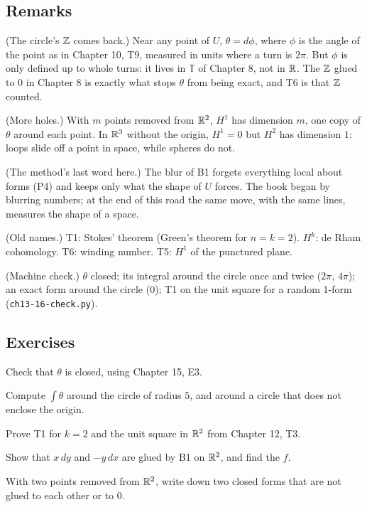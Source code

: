 \subsection*{Remarks}

\begin{lines}
\item[\lab{R1}] (The circle's $\mathbb{Z}$ comes back.) Near any point of $U$, $\theta = d\phi$, where $\phi$ is the angle of the point as in Chapter 10, T9, measured in units where a turn is $2\pi$. But $\phi$ is only defined up to whole turns: it lives in $\mathbb{T}$ of Chapter 8, not in $\mathbb{R}$. The $\mathbb{Z}$ glued to $0$ in Chapter 8 is exactly what stops $\theta$ from being exact, and T6 is that $\mathbb{Z}$ counted.
\item[\lab{R2}] (More holes.) With $m$ points removed from $\mathbb{R}^2$, $H^1$ has dimension $m$, one copy of $\theta$ around each point. In $\mathbb{R}^3$ without the origin, $H^1 = 0$ but $H^2$ has dimension $1$: loops slide off a point in space, while spheres do not.
\item[\lab{R3}] (The method's last word here.) The blur of B1 forgets everything local about forms (P4) and keeps only what the shape of $U$ forces. The book began by blurring numbers; at the end of this road the same move, with the same lines, measures the shape of a space.
\item[\lab{R4}] (Old names.) T1: Stokes' theorem (Green's theorem for $n = k = 2$). $H^k$: de Rham cohomology. T6: winding number. T5: $H^1$ of the punctured plane.
\item[\lab{R5}] (Machine check.) $\theta$ closed; its integral around the circle once and twice ($2\pi$, $4\pi$); an exact form around the circle ($0$); T1 on the unit square for a random 1-form (\texttt{ch13-16-check.py}).
\end{lines}

\subsection*{Exercises}

\begin{lines}
\item[\lab{E1}] Check that $\theta$ is closed, using Chapter 15, E3.
\item[\lab{E2}] Compute $\int \theta$ around the circle of radius $5$, and around a circle that does not enclose the origin.
\item[\lab{E3}] Prove T1 for $k = 2$ and the unit square in $\mathbb{R}^2$ from Chapter 12, T3.
\item[\lab{E4}] Show that $x\,dy$ and $-y\,dx$ are glued by B1 on $\mathbb{R}^2$, and find the $f$.
\item[\lab{E5}] With two points removed from $\mathbb{R}^2$, write down two closed forms that are not glued to each other or to $0$.
\end{lines}

